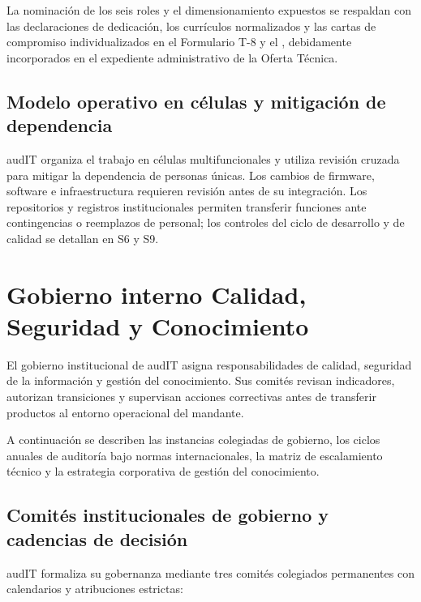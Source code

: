 La nominación de los seis roles y el dimensionamiento expuestos se respaldan con las declaraciones de dedicación, los currículos normalizados y las cartas de compromiso individualizados en el Formulario T-8 y el , debidamente incorporados en el expediente administrativo de la Oferta Técnica.

\subsection{Modelo operativo en células y mitigación de dependencia}\label{sec:1-celulas}

audIT organiza el trabajo en células multifuncionales y utiliza revisión cruzada para mitigar la dependencia de personas únicas. Los cambios de firmware, software e infraestructura requieren revisión antes de su integración. Los repositorios y registros institucionales permiten transferir funciones ante contingencias o reemplazos de personal; los controles del ciclo de desarrollo y de calidad se detallan en S6 y S9.

\section{Gobierno interno Calidad, Seguridad y Conocimiento}\label{sec:1-gobierno}

El gobierno institucional de audIT asigna responsabilidades de calidad, seguridad de la información y gestión del conocimiento. Sus comités revisan indicadores, autorizan transiciones y supervisan acciones correctivas antes de transferir productos al entorno operacional del mandante.

A continuación se describen las instancias colegiadas de gobierno, los ciclos anuales de auditoría bajo normas internacionales, la matriz de escalamiento técnico y la estrategia corporativa de gestión del conocimiento.

\subsection{Comités institucionales de gobierno y cadencias de decisión}\label{sec:1-comites}

audIT formaliza su gobernanza mediante tres comités colegiados permanentes con calendarios y atribuciones estrictas:

